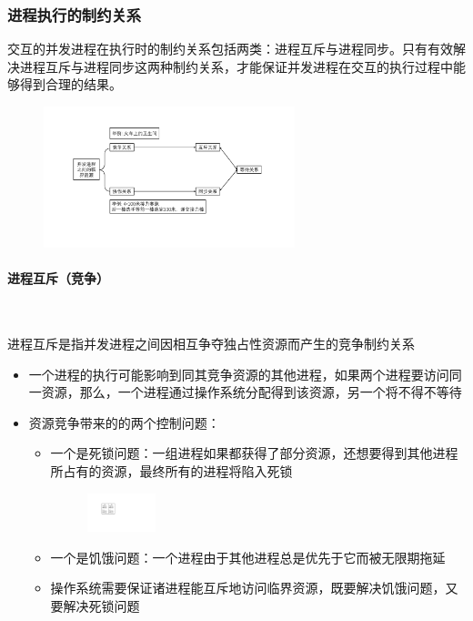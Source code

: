 \documentclass[cs4size,a4paper,10pt]{ctexart}
\begin{document}
	
	\subsubsection{进程执行的制约关系}

	交互的并发进程在执行时的制约关系包括两类：进程互斥与进程同步。只有有效解决进程互斥与进程同步这两种制约关系，才能保证并发进程在交互的执行过程中能够得到合理的结果。

	\begin{figure}[H]
		\centering
		\includegraphics[width=0.65\textwidth]{img/6.1.2.3}
	\end{figure}

	\paragraph{进程互斥（竞争）}~{}

	进程互斥是指并发进程之间因相互争夺独占性资源而产生的竞争制约关系
	\begin{itemize}
		\item 一个进程的执行可能影响到同其竞争资源的其他进程，如果两个进程要访问同一资源，那么，一个进程通过操作系统分配得到该资源，另一个将不得不等待
		\item 资源竞争带来的的两个控制问题：
		\begin{itemize}
			\item 一个是死锁问题：一组进程如果都获得了部分资源，还想要得到其他进程所占有的资源，最终所有的进程将陷入死锁
			\begin{figure}[H]
				\centering
				\includegraphics[width=0.2\textwidth]{img/6.1.2.3.1}
			\end{figure}
			\item 一个是饥饿问题：一个进程由于其他进程总是优先于它而被无限期拖延
			\item 操作系统需要保证诸进程能互斥地访问临界资源，既要解决饥饿问题，又要解决死锁问题
		\end{itemize}
	\end{itemize}
\end{document}
